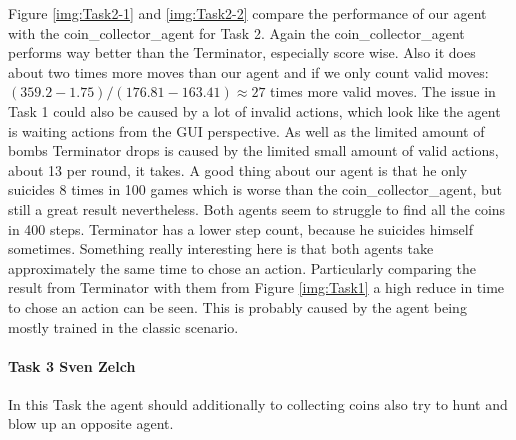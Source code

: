 \documentclass[
	letterpaper, %
	12pt, %
]{CSUniSchoolLabReport}
\begin{document}
Figure \ref{img:Task2-1} and \ref{img:Task2-2} compare the performance of our agent with the coin\_collector\_agent for Task 2.
Again the coin\_collector\_agent performs way better than the Terminator, especially score wise.
Also it does about two times more moves than our agent and if we only count valid moves:
$(359.2- 1.75) / (176.81 - 163.41) \approx 27$
times more valid moves.
The issue in Task 1 could also be caused by a lot of invalid actions, which look like the agent is waiting actions from the GUI perspective.
As well as the limited amount of bombs Terminator drops is caused by the limited small amount of valid actions, about 13 per round, it takes.
A good thing about our agent is that he only suicides 8 times in 100 games which is worse than the coin\_collector\_agent, but still a great result nevertheless.
Both agents seem to struggle to find all the coins in 400 steps.
Terminator has a lower step count, because he suicides himself sometimes.
Something really interesting here is that both agents take approximately the same time to chose an action.
Particularly comparing the result from Terminator with them from Figure \ref{img:Task1} a high reduce in time to chose an action can be seen.
This is probably caused by the agent being mostly trained in the classic scenario.

\paragraph{Task 3 \tiny Sven Zelch}

In this Task the agent should additionally to collecting coins also try to hunt and blow up an opposite agent.
\end{document}
